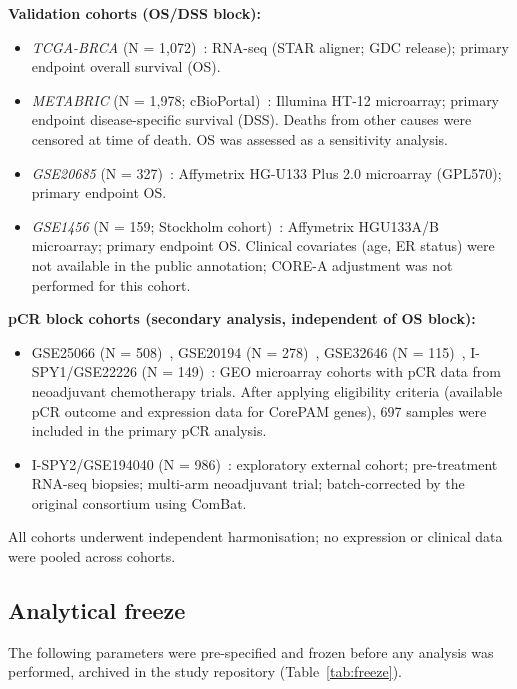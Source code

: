 \documentclass[pdflatex,sn-vancouver-num]{sn-jnl}
\begin{document}
\textbf{Validation cohorts (OS/DSS block):}

\begin{itemize}
\item \textit{TCGA-BRCA} (N = 1,072)~\cite{tcga2012}: RNA-seq (STAR aligner; GDC release); primary endpoint overall survival (OS).
\item \textit{METABRIC} (N = 1,978; cBioPortal)~\cite{curtis2012}: Illumina HT-12 microarray; primary endpoint disease-specific survival (DSS). Deaths from other causes were censored at time of death. OS was assessed as a sensitivity analysis.
\item \textit{GSE20685} (N = 327)~\cite{kao2011}: Affymetrix HG-U133 Plus 2.0 microarray (GPL570); primary endpoint OS.
\item \textit{GSE1456} (N = 159; Stockholm cohort)~\cite{pawitan2005}: Affymetrix HGU133A/B microarray; primary endpoint OS. Clinical covariates (age, ER status) were not available in the public annotation; CORE-A adjustment was not performed for this cohort.
\end{itemize}

\textbf{pCR block cohorts (secondary analysis, independent of OS block):}

\begin{itemize}
\item GSE25066 (N = 508)~\cite{hatzis2011}, GSE20194 (N = 278)~\cite{maqc2010}, GSE32646 (N = 115)~\cite{miyake2012}, I-SPY1/GSE22226 (N = 149)~\cite{esserman2012}: GEO microarray cohorts with pCR data from neoadjuvant chemotherapy trials. After applying eligibility criteria (available pCR outcome and expression data for CorePAM genes), 697 samples were included in the primary pCR analysis.
\item I-SPY2/GSE194040 (N = 986)~\cite{wolf2022}: exploratory external cohort; pre-treatment RNA-seq biopsies; multi-arm neoadjuvant trial; batch-corrected by the original consortium using ComBat.
\end{itemize}

All cohorts underwent independent harmonisation; no expression or clinical data were pooled across cohorts.

\subsection{Analytical freeze}\label{subsec:analytical-freeze}

The following parameters were pre-specified and frozen before any analysis was performed, archived in the study repository (Table~\ref{tab:freeze}).
\end{document}
